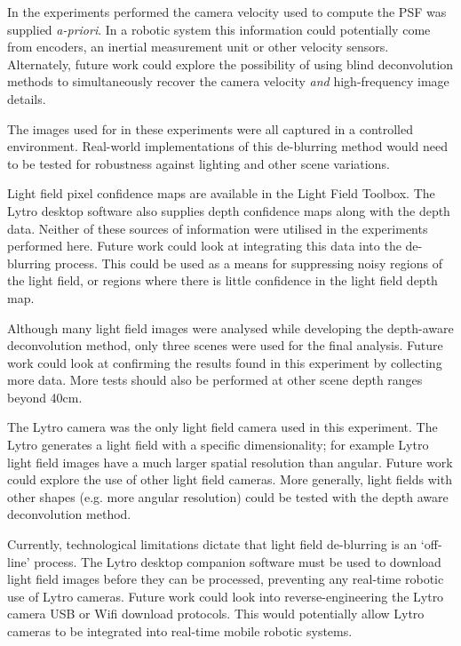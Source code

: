 In the experiments performed the camera velocity used to compute the PSF was supplied \emph{a-priori}.
In a robotic system this information could potentially come from encoders, an inertial measurement unit or other velocity sensors.
Alternately, future work could explore the possibility of using blind deconvolution methods to simultaneously recover the camera velocity \emph{and} high-frequency image details.

The images used for in these experiments were all captured in a controlled environment.
Real-world implementations of this de-blurring method would need to be tested for robustness against lighting and other scene variations.

Light field pixel confidence maps are available in the Light Field Toolbox.
The Lytro desktop software also supplies depth confidence maps along with the depth data.
Neither of these sources of information were utilised in the experiments performed here.
Future work could look at integrating this data into the de-blurring process.
This could be used as a means for suppressing noisy regions of the light field, or regions where there is little confidence in the light field depth map.

Although many light field images were analysed while developing the depth-aware deconvolution method, only three scenes were used for the final analysis.
Future work could look at confirming the results found in this experiment by collecting more data.
More tests should also be performed at other scene depth ranges beyond 40cm.

The Lytro camera was the only light field camera used in this experiment.
The Lytro generates a light field with a specific dimensionality; for example Lytro light field images have a much larger spatial resolution than angular.
Future work could explore the use of other light field cameras.
More generally, light fields with other shapes (e.g. more angular resolution) could be tested with the depth aware deconvolution method.

Currently, technological limitations dictate that light field de-blurring is an \enquote*{off-line} process.
The Lytro desktop companion software must be used to download light field images before they can be processed, preventing any real-time robotic use of Lytro cameras.
Future work could look into reverse-engineering the Lytro camera USB or Wifi download protocols.
This would potentially allow Lytro cameras to be integrated into real-time mobile robotic systems.

